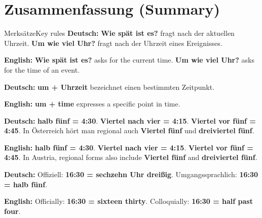 \documentclass[a4paper,11pt]{article}
\newcommand{\GermanText}[1]{\textbf{Deutsch: }#1\par}
\newcommand{\EnglishText}[1]{{\small\color{SoftGray}\textbf{English: }#1\par}}
\begin{document}
\section{Zusammenfassung \textnormal{(Summary)}}
\begin{grammarentry}{Merksätze}{Key rules}
\GermanText{\textbf{Wie spät ist es?} fragt nach der aktuellen Uhrzeit. \textbf{Um wie viel Uhr?} fragt nach der Uhrzeit eines Ereignisses.}
\EnglishText{\textbf{Wie spät ist es?} asks for the current time. \textbf{Um wie viel Uhr?} asks for the time of an event.}
\GermanText{\textbf{um + Uhrzeit} bezeichnet einen bestimmten Zeitpunkt.}
\EnglishText{\textbf{um + time} expresses a specific point in time.}
\GermanText{\textbf{halb fünf = 4:30}. \textbf{Viertel nach vier = 4:15}. \textbf{Viertel vor fünf = 4:45}. In Österreich hört man regional auch \textbf{Viertel fünf} und \textbf{dreiviertel fünf}.}
\EnglishText{\textbf{halb fünf = 4:30}. \textbf{Viertel nach vier = 4:15}. \textbf{Viertel vor fünf = 4:45}. In Austria, regional forms also include \textbf{Viertel fünf} and \textbf{dreiviertel fünf}.}
\GermanText{Offiziell: \textbf{16:30 = sechzehn Uhr dreißig}. Umgangssprachlich: \textbf{16:30 = halb fünf}.}
\EnglishText{Officially: \textbf{16:30 = sixteen thirty}. Colloquially: \textbf{16:30 = half past four}.}
\end{grammarentry}
\end{document}
